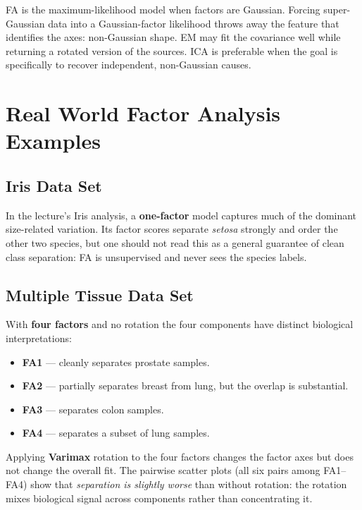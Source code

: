 \documentclass[11pt, oneside]{book}
\begin{document}
\begin{intbox}[title={Why FA fails for non-Gaussian sources}]
FA is the maximum-likelihood model when factors are Gaussian.
Forcing super-Gaussian data into a Gaussian-factor likelihood throws away the feature
that identifies the axes: non-Gaussian shape. EM may fit the covariance well while
returning a rotated version of the sources. ICA is preferable when the goal is
specifically to recover independent, non-Gaussian causes.
\end{intbox}


\section{Real World Factor Analysis Examples}

\subsection{Iris Data Set}

In the lecture's Iris analysis, a \textbf{one-factor} model captures much of the dominant
size-related variation. Its factor scores separate \textit{setosa} strongly and order the
other two species, but one should not read this as a general guarantee of clean class
separation: FA is unsupervised and never sees the species labels.

\subsection{Multiple Tissue Data Set}

With \textbf{four factors} and no rotation the four components have distinct
biological interpretations:
\begin{itemize}
  \item \textbf{FA1} — cleanly separates prostate samples.
  \item \textbf{FA2} — partially separates breast from lung, but the overlap is
        substantial.
  \item \textbf{FA3} — separates colon samples.
  \item \textbf{FA4} — separates a subset of lung samples.
\end{itemize}

Applying \textbf{Varimax} rotation to the four factors changes the factor axes
but does not change the overall fit.
The pairwise scatter plots (all six pairs among FA1–FA4) show that
\emph{separation is slightly worse} than without rotation: the rotation mixes
biological signal across components rather than concentrating it.
\end{document}
